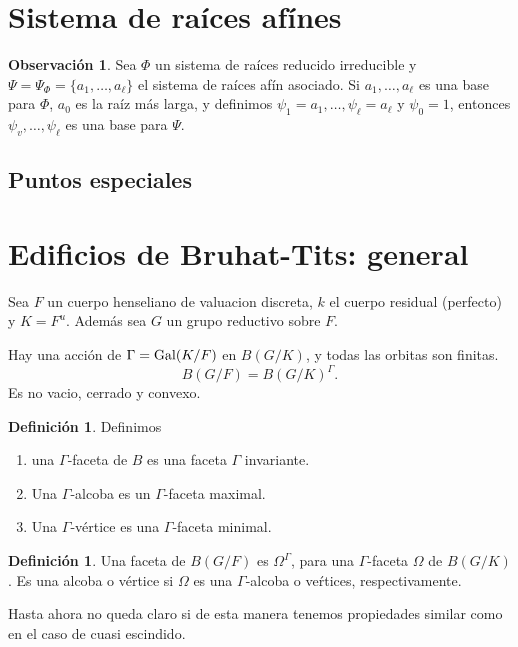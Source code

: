 \documentclass[oneside,12pt]{amsart}
\theoremstyle{definition}
\newtheorem{defi}[theorem]{Definición}
\newtheorem{remark}[theorem]{Observación}
\numberwithin{equation}{section}
\begin{document}
 \section{Sistema de ra\'ices af\'ines}
 

\begin{remark}
    Sea $\Phi$ un sistema de raíces reducido irreducible y $\Psi = \Psi_\Phi=\{a_1, \ldots, a_\ell\}$ el sistema de raíces afín asociado. 
     Si $a_1, \ldots, a_\ell$ es una base para $\Phi$, $a_0$ es la raíz más larga, y definimos $\psi_1 = 
    a_1, \ldots, \psi_\ell = a_\ell$ y $\psi_0 = 1$, entonces $\psi_v, \ldots, \psi_\ell$ es una base para $\Psi$. 
\end{remark}



\subsection{Puntos especiales}



\section{Edificios de Bruhat-Tits: general} Sea $F$ un cuerpo henseliano de valuacion discreta, $k$ el cuerpo residual (perfecto) y $K=F^u$. Adem\'as sea $G$ un grupo reductivo sobre $F$.


Hay una acci\'on de $\Gamma={\rm Gal}(K/F)$ en $B(G/K)$, y todas las orbitas son finitas.
\[B(G/F)=B(G/K)^{\Gamma}.\]
Es no vacio, cerrado y convexo.
\begin{defi}Definimos
    \begin{enumerate}
        \item una $\Gamma$-faceta de $B$ es una faceta $\Gamma$ invariante.
        \item Una $\Gamma$-alcoba es un $\Gamma$-faceta maximal.
        \item Una $\Gamma$-v\'ertice es una $\Gamma$-faceta minimal.
\end{enumerate}
\end{defi}

\begin{defi}
    Una faceta de $B(G/F)$ es $\Omega^\Gamma$, para una $\Gamma$-faceta $\Omega$ de $B(G/K)$. Es una alcoba o v\'ertice si $\Omega$ es  una $\Gamma$-alcoba o ve\'rtices, respectivamente.
\end{defi}


Hasta ahora no queda claro si de esta manera tenemos propiedades similar como en el caso de cuasi escindido.
\end{document}
